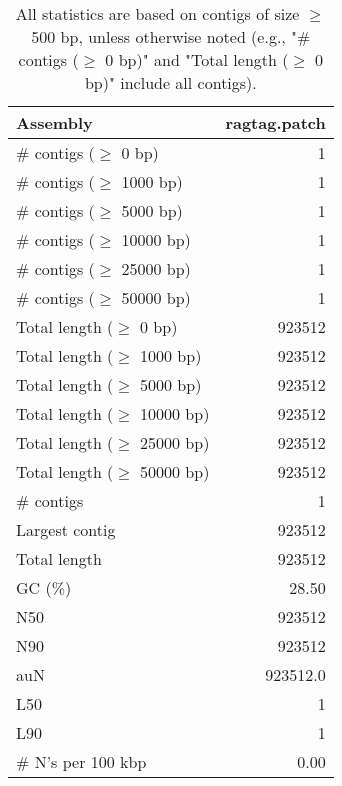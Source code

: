 \documentclass[12pt,a4paper]{article}
\begin{document}
\begin{table}[ht]
\begin{center}
\caption{All statistics are based on contigs of size $\geq$ 500 bp, unless otherwise noted (e.g., "\# contigs ($\geq$ 0 bp)" and "Total length ($\geq$ 0 bp)" include all contigs).}
\begin{tabular}{|l*{1}{|r}|}
\hline
Assembly & ragtag.patch \\ \hline
\# contigs ($\geq$ 0 bp) & 1 \\ \hline
\# contigs ($\geq$ 1000 bp) & 1 \\ \hline
\# contigs ($\geq$ 5000 bp) & 1 \\ \hline
\# contigs ($\geq$ 10000 bp) & 1 \\ \hline
\# contigs ($\geq$ 25000 bp) & 1 \\ \hline
\# contigs ($\geq$ 50000 bp) & 1 \\ \hline
Total length ($\geq$ 0 bp) & 923512 \\ \hline
Total length ($\geq$ 1000 bp) & 923512 \\ \hline
Total length ($\geq$ 5000 bp) & 923512 \\ \hline
Total length ($\geq$ 10000 bp) & 923512 \\ \hline
Total length ($\geq$ 25000 bp) & 923512 \\ \hline
Total length ($\geq$ 50000 bp) & 923512 \\ \hline
\# contigs & 1 \\ \hline
Largest contig & 923512 \\ \hline
Total length & 923512 \\ \hline
GC (\%) & 28.50 \\ \hline
N50 & 923512 \\ \hline
N90 & 923512 \\ \hline
auN & 923512.0 \\ \hline
L50 & 1 \\ \hline
L90 & 1 \\ \hline
\# N's per 100 kbp & 0.00 \\ \hline
\end{tabular}
\end{center}
\end{table}
\end{document}
